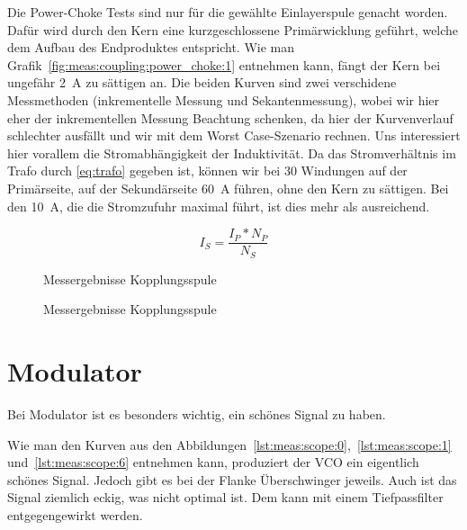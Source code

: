 Die  Power-Choke Tests  sind nur  f\"ur die  gew\"ahlte Einlayerspule  genacht
worden. Daf\"ur  wird durch  den Kern  eine kurzgeschlossene  Prim\"arwicklung
gef\"uhrt,   welche   dem   Aufbau  des   Endproduktes   entspricht. Wie   man
Grafik~\ref{fig:meas:coupling:power_choke:1} entnehmen kann,  f\"angt der Kern
bei  ungef\"ahr  \SI{2}{\ampere}  zu  s\"attigen an. Die  beiden  Kurven  sind
zwei  verschidene Messmethoden  (inkrementelle  Messung und  Sekantenmessung),
wobei  wir  hier  eher  der  inkrementellen  Messung  Beachtung  schenken,  da
hier  der   Kurvenverlauf  schlechter  ausf\"allt   und  wir  mit   dem  Worst
Case-Szenario rechnen. Uns interessiert  hier vorallem die Stromabh\"angigkeit
der  Induktivit\"at. Da das  Stromverh\"altnis im  Trafo durch  \ref{eq:trafo}
gegeben ist,  k\"onnen wir  bei 30  Windungen auf  der Prim\"arseite,  auf der
Sekund\"arseite \SI{60}{\ampere}  f\"uhren, ohne  den Kern  zu s\"attigen. Bei
den \SI{10}{\ampere}, die  die Stromzufuhr maximal f\"uhrt, ist  dies mehr als
ausreichend.

\begin{equation}\label{eq:trafo}
    I_S = \frac{I_P * N_P}{N_S}
\end{equation}

\begin{figure}[h!tb]
    \centering
    
    \caption[Messresultate Kopplungsspule]{Messergebnisse Kopplungsspule}
    \label{fig:meas:coupling:coil:power_choke:1}
\end{figure}

\begin{figure}[h!tb]
    \centering
    
    \caption[Messresultate Kopplungsspule]{Messergebnisse Kopplungsspule}
    \label{fig:meas:coupling:coil:power_choke:2}
\end{figure}

\section{Modulator}
\label{sec:val:modulator}

Bei Modulator ist es besonders wichtig, ein sch\"ones Signal zu haben.

Wie               man               den               Kurven               aus
den                 Abbildungen~\ref{lst:meas:scope:0},~\ref{lst:meas:scope:1}
und~\ref{lst:meas:scope:6} entnehmen  kann, produziert der VCO  ein eigentlich
sch\"ones Signal. Jedoch gibt es  bei der Flanke \"Uberschwinger jeweils. Auch
ist  das Signal  ziemlich eckig,  was nicht  optimal ist. Dem  kann mit  einem
Tiefpassfilter entgegengewirkt werden.

